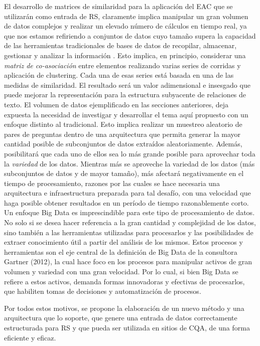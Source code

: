 \bigskip El desarrollo de matrices de similaridad para la aplicación del EAC que se utilizarán como entrada de RS, claramente implica manipular un gran volumen de datos complejos y realizar un elevado número de cálculos en tiempo real, ya que nos estamos refiriendo a conjuntos de datos cuyo tamaño supera la capacidad de las herramientas tradicionales de bases de datos de recopilar, almacenar, gestionar y analizar la información \citep{de2016mineria}. Esto implica, en principio, considerar una \textit{matriz de co-asociación} entre elementos realizando varias series de corridas y aplicación de clustering. Cada una de esas series está basada en una de las medidas de similaridad. El resultado será un valor adimensional e insesgado que puede mejorar la representación para la estructura subyacente de relaciones de texto. El volumen de datos ejemplificado en las secciones anteriores, deja expuesta la necesidad de investigar y desarrollar el tema aquí propuesto con un enfoque distinto al tradicional. Esto implica realizar un muestreo aleatorio de pares de preguntas dentro de una arquitectura que permita generar la mayor cantidad posible de subconjuntos de datos extraídos aleatoriamente. Además, posibilitará que cada uno de ellos sea lo más grande posible para aprovechar toda la \textit{variedad} de los datos. Mientras más se aproveche la variedad de los datos (más subconjuntos de datos y de mayor tamaño), más afectará negativamente en el tiempo de procesamiento, razones por las cuales se hace necesaria una arquitectura e infraestructura preparada para tal desafío, con una velocidad que haga posible obtener resultados en un período de tiempo razonablemente corto. Un enfoque Big Data es imprescindible  para este tipo de procesamiento de datos. No solo si se desea hacer referencia a la gran cantidad y complejidad de los datos, sino también a las herramientas utilizadas para procesarlos y las posibilidades de extraer conocimiento útil a partir del análisis de los mismos. Estos procesos y herramientas son el eje central de la definición de Big Data de la consultora Gartner (2012), la cual hace foco en los procesos para manipular activos de gran volumen y variedad con una gran velocidad. Por lo cual, si bien Big Data se refiere a estos activos, demanda formas innovadoras y efectivas de procesarlos, que habiliten tomas de decisiones y automatización de procesos.

\bigskip Por todos estos motivos, se propone la elaboración de un nuevo método y una arquitectura que lo soporte, que genere una entrada de datos correctamente estructurada para RS y que pueda ser utilizada en sitios de CQA, de una forma eficiente y eficaz.

